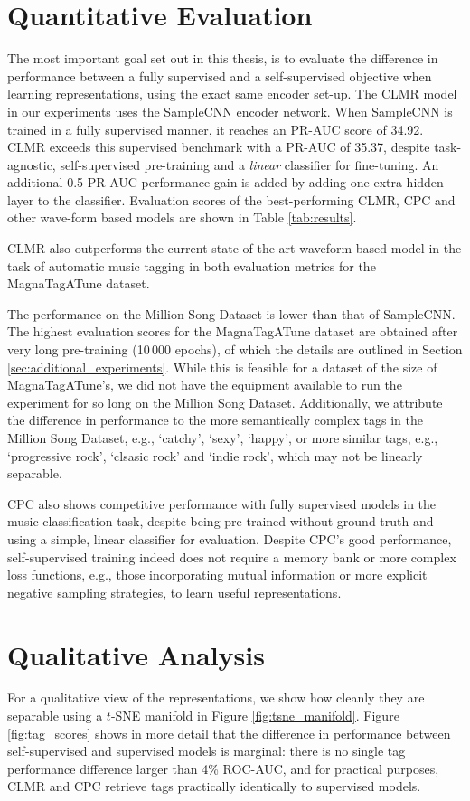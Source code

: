 \section{Quantitative Evaluation}
The most important goal set out in this thesis, is to evaluate the difference in performance between a fully supervised and a self-supervised objective when learning representations, using the exact same encoder set-up. The CLMR model in our experiments uses the SampleCNN encoder network. When SampleCNN is trained in a fully supervised manner, it reaches an PR-AUC score of 34.92. CLMR exceeds this supervised benchmark with a PR-AUC of 35.37, despite task-agnostic, self-supervised pre-training and a \textit{linear} classifier for fine-tuning. An additional 0.5 PR-AUC performance gain is added by adding one extra hidden layer to the classifier. Evaluation scores of the best-performing CLMR, CPC and other wave-form based models are shown in Table \ref{tab:results}.

CLMR also outperforms the current state-of-the-art waveform-based model in the task of automatic music tagging \cite{pons_end--end_2017} in both evaluation metrics for the MagnaTagATune dataset.

The performance on the Million Song Dataset is lower than that of SampleCNN. The highest evaluation scores for the MagnaTagATune dataset are obtained after very long pre-training (10\,000 epochs), of which the details are outlined in Section \ref{sec:additional_experiments}. While this is feasible for a dataset of the size of MagnaTagATune's, we did not have the equipment available to run the experiment for so long on the Million Song Dataset. Additionally, we attribute the difference in performance to the more semantically complex tags in the Million Song Dataset, e.g., `catchy', `sexy', `happy', or more similar tags, e.g., `progressive rock', `clsasic rock' and `indie rock', which may not be linearly separable. 

CPC also shows competitive performance with fully supervised models in the music classification task, despite being pre-trained without ground truth and using a simple, linear classifier for evaluation.
Despite CPC's good performance, self-supervised training indeed does not require a memory bank or more complex loss functions, e.g., those incorporating mutual information or more explicit negative sampling strategies, to learn useful representations.


\section{Qualitative Analysis}
For a qualitative view of the representations, we show how cleanly they are  separable using a $t$-SNE manifold in Figure \ref{fig:tsne_manifold}.
Figure \ref{fig:tag_scores} shows in more detail that the difference in performance between self-supervised and supervised models is marginal: there is no single tag performance difference larger than 4\% ROC-AUC, and for practical purposes, CLMR and CPC retrieve tags practically identically to supervised models.

